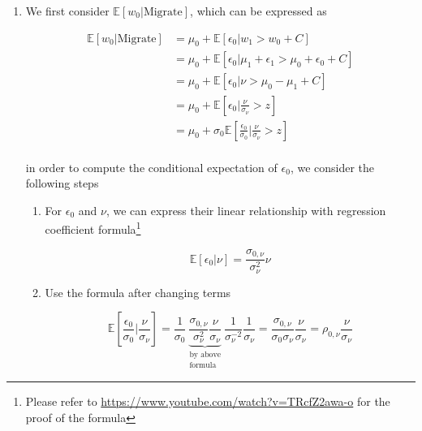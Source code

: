 \documentclass[11pt]{article}
\newcommand{\ept}{\mathbb{E}}
\begin{document}
        \begin{enumerate}

            \item We first consider $\ept[w_0 | \text{Migrate}]$, which can be expressed as

                \[\begin{aligned}
                    \ept[w_0 | \text{Migrate}] &= \mu_0 + \ept[\epsilon_0 | w_1 > w_0 + C]  \\
                                               &= \mu_0 + \ept[\epsilon_0 | \mu_1 + \epsilon_1 > \mu_0 + \epsilon_0 + C]  \\
                                               &= \mu_0 + \ept[\epsilon_0 | \nu > \mu_0 - \mu_1 + C]  \\
                                               &= \mu_0 + \ept[\epsilon_0 | \frac{\nu}{\sigma_\nu} > z]  \\
                                               &= \mu_0 + \sigma_0\ept[\frac{\epsilon_0}{\sigma_0} | \frac{\nu}{\sigma_\nu} > z]  \\
                \end{aligned}\]

            in order to compute the conditional expectation of $\epsilon_0$, we consider the following steps

            \begin{enumerate}

                \item For $\epsilon_0$ and $\nu$, we can express their linear relationship with regression coefficient formula\footnote{Please refer to \url{https://www.youtube.com/watch?v=TRcfZ2awa-o} for the proof of the formula}
                
                \[
                    \ept[\epsilon_0 | \nu] = \frac{\sigma_{0,\nu}}{\sigma_\nu^2}\nu    
                \]

                \item Use the formula after changing terms
                
                \begin{equation}
                    \ept[\frac{\epsilon_0}{\sigma_0} | \frac{\nu}{\sigma_\nu}] 
                    = \frac{1}{\sigma_0} \underbrace{\frac{\sigma_{0,\nu}}{\sigma_\nu^2}\frac{\nu}{\sigma_\nu}}_{\substack{\text{by above}\\\text{formula}}} \frac{1}{\sigma^{-2}_\nu}\frac{1}{\sigma_\nu}
                    = \frac{\sigma_{0,\nu}}{\sigma_0\sigma_\nu}\frac{\nu}{\sigma_\nu}
                    = \rho_{0,\nu}\frac{\nu}{\sigma_\nu}
                \end{equation}


\end{enumerate}
\end{enumerate}
\end{document}
